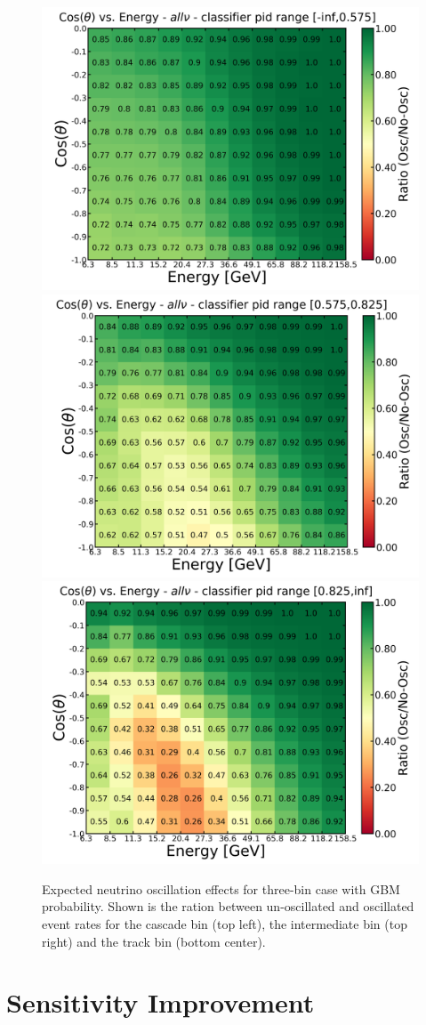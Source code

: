 \begin{figure}[h]
    \centering
    \includegraphics[width=0.49\linewidth]{figures/three_bin_cut_0575_0825_allnu_0_ratio_osc_noosc.png}
    \includegraphics[width=0.49\linewidth]{figures/three_bin_cut_0575_0825_allnu_1_ratio_osc_noosc.png}
    \includegraphics[width=0.49\linewidth]{figures/three_bin_cut_0575_0825_allnu_2_ratio_osc_noosc.png}
    \caption[Expected neutrino oscillation effects for three-bin case with GBM probability]{Expected neutrino oscillation effects for three-bin case with GBM probability. Shown is the ration between un-oscillated and oscillated event rates for the cascade bin (top left), the intermediate bin (top right) and the track bin (bottom center).}
    \label{fig:oscillation_effects_gbm_3bin}
\end{figure}

\newpage

\section{Sensitivity Improvement} \label{sec:sensitivity_improvement}

